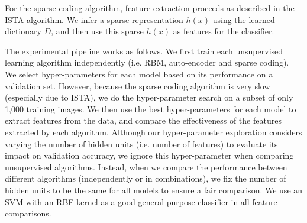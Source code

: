 \documentclass{article} %
\begin{document}
For the sparse coding algorithm, feature extraction proceeds as described in the ISTA algorithm. We infer a sparse representation $h(x)$ using the learned dictionary $D$, and then use this sparse $h(x)$ as features for the classifier.

The experimental pipeline works as follows. We first train each unsupervised learning algorithm independently (i.e. RBM, auto-encoder and sparse coding). We select hyper-parameters for each model based on its performance on a validation set. However, because the sparse coding algorithm is very slow (especially due to ISTA), we do the hyper-parameter search on a subset of only 1,000 training images. We then use the best hyper-parameters for each model to extract features from the data, and compare the effectiveness of the features extracted by each algorithm. Although our hyper-parameter exploration considers varying the number of hidden units (i.e. number of features) to evaluate its impact on validation accuracy, we ignore this hyper-parameter when comparing unsupervised algorithms. Instead, when we compare the performance between different algorithms (independently or in combinations), we fix the number of hidden units to be the same for all models to ensure a fair comparison. We use an SVM with an RBF kernel as a good general-purpose classifier in all feature comparisons.
\end{document}
